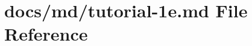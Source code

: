 \hypertarget{tutorial-1e_8md}{}\section{docs/md/tutorial-\/1e.md File Reference}
\label{tutorial-1e_8md}
